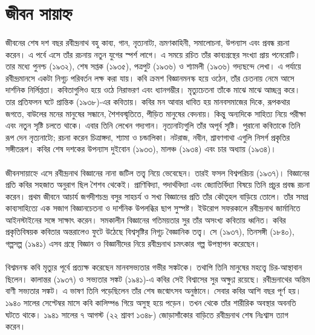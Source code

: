 \documentclass{article}
\begin{document}
\section{জীবন সায়াহ্ন}
\paragraph{}
জীবনের শেষ দশ বছর রবীন্দ্রনাথ বহু কাব্য, গান, নৃত্যনাট্য, ভ্রমণকাহিনী, সমালোচনা, উপন্যাস এবং প্রবন্ধ রচনা করেন। এ পর্বে এসে তাঁর রচনায় নতুন যুগের স্পর্শ লাগে। এ সময়ে রচিত তাঁর কাব্যগ্রন্থের সংখ্যা প্রায় পনেরোটি। তার মধ্যে পুনশ্চ (১৯৩২), শেষ সপ্তক (১৯৩৫), পত্রপুট (১৯৩৬) ও শ্যামলী (১৯৩৬) গদ্যছন্দে লেখা। এ পর্যায়ে রবীন্দ্রমানসে একটা নিগূঢ় পরিবর্তন লক্ষ করা যায়। কবি ক্রমশ বিজ্ঞানমনস্ক হয়ে ওঠেন, তাঁর চেতনায় নেমে আসে দার্শনিক নির্লিপ্ততা। কবিতাগুলিও হয়ে ওঠে নিরাভরণ এবং ধ্যানগম্ভীর। মৃত্যুচেতনা তাঁকে মাঝে মাঝে আচ্ছন্ন করে। তার প্রতিফলন ঘটে প্রান্তিক (১৯৩৮)-এর কবিতায়। কবির মন আবার ধাবিত হয় মানবসমাজের দিকে, রূপকথার জগতে, বাউলের মনের মানুষের সন্ধানে, শৈশবস্মৃতিতে, পীড়িত মানুষের বেদনায়। কিন্তু অন্যদিকে সাহিত্য নিয়ে পরীক্ষা এবং নতুন সৃষ্টি চলতে থাকে। এবার তিনি লেখেন গদ্যগান। নৃত্যনাট্যগুলি তাঁর অপূর্ব সৃষ্টি। পুরানো কবিতাকে তিনি রূপ দেন নৃত্যনাট্যে; রচনা করেন চিত্রাঙ্গদা, শ্যামা ও চন্ডালিকা। নটরাজ, নবীন, শ্রাবণগাথা এগুলি নিসর্গ প্রকৃতির সঙ্গীতরূপ। কবির শেষ দশকের উপন্যাস দুইবোন (১৯৩৩), মালঞ্চ (১৯৩৪) এবং চার অধ্যায় (১৯৩৪)।
\paragraph{}
জীবনসায়াহ্নে এসে রবীন্দ্রনাথ বিজ্ঞানের নানা জটিল তত্ত্ব নিয়ে ভেবেছেন। তারই ফসল বিশ্বপরিচয় (১৯৩৭)। বিজ্ঞানের প্রতি কবির সহজাত অনুরাগ ছিল শৈশব থেকেই। প্রাণিবিদ্যা, পদার্থবিদ্যা এবং জ্যোতির্বিদ্যা বিষয়ে তিনি প্রচুর প্রবন্ধ রচনা করেন। প্রথম জীবনে আচার্য জগদীশচন্দ্র বসুর সাহচর্য ও সখ্য বিজ্ঞানের প্রতি তাঁর কৌতূহল বাড়িয়ে তোলে। তাঁর সমগ্র কাব্যসাহিত্যে এক সজাগ বিজ্ঞানচেতনা ও দার্শনিক উপলব্ধির ছাপ সুস্পষ্ট। ইউরোপ সফরকালে রবীন্দ্রনাথ জার্মানিতে আইনস্টাইনের সঙ্গে সাক্ষাৎ করেন। সমকালীন বিজ্ঞানের গতিময়তার সুর তাঁর অসংখ্য কবিতায় ধ্বনিত। কবির প্রকৃতিবিষয়ক কবিতার অন্তরালেও ফুটে উঠেছে বিশ্বসৃষ্টির নিগূঢ় বৈজ্ঞানিক তত্ত্ব। সে (১৯৩৭), তিনসঙ্গী (১৮৪০), গল্পসল্প (১৯৪১) এসব গ্রন্থে বিজ্ঞান ও বিজ্ঞানীদের নিয়ে রবীন্দ্রনাথ চমৎকার গল্প উপস্থাপন করেছেন।
\paragraph{}
বিশ্বমনস্ক কবি মৃত্যুর পূর্বে প্রত্যক্ষ করেছেন মানবসভ্যতার গভীর সঙ্কটকে। তথাপি তিনি মানুষের মহত্ত্বে চির-আস্থাবান ছিলেন। কালান্তর (১৯৩৭) ও সভ্যতার সঙ্কট (১৯৪১)-এ কবির সেই বিশ্বাসের সুর অক্ষুণ্ণ রয়েছে। রবীন্দ্রনাথের অন্তিম বাণী সভ্যতার সঙ্কট। এ ভাষণ তিনি পড়েছিলেন তাঁর শেষ জন্মোৎসব অনুষ্ঠানে। সেবার কবির আশি বছর পূর্ণ হয়। ১৯৪০ সালের সেপ্টেম্বর মাসে কবি কালিম্পঙ গিয়ে অসুস্থ হয়ে পড়েন। তখন থেকে তাঁর শারীরিক অবস্থার অবনতি ঘটতে থাকে। ১৯৪১ সালের ৭ আগস্ট (২২ শ্রাবণ ১৩৪৮) জোড়াসাঁকোর বাড়িতে রবীন্দ্রনাথ শেষ নিঃশ্বাস ত্যাগ করেন।
\end{document}
